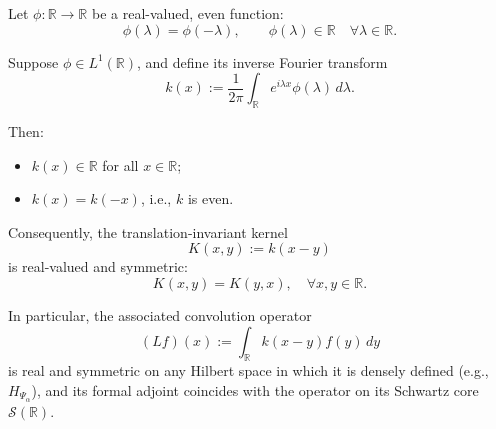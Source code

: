 \begin{lemma}
\label{lem:fourier_symmetry_reflection}
Let \( \phi \colon \mathbb{R} \to \mathbb{R} \) be a real-valued, even function:
\[
\phi(\lambda) = \phi(-\lambda), \qquad \phi(\lambda) \in \mathbb{R} \quad \forall \lambda \in \mathbb{R}.
\]

Suppose \( \phi \in L^1(\mathbb{R}) \), and define its inverse Fourier transform
\[
k(x) := \frac{1}{2\pi} \int_{\mathbb{R}} e^{i \lambda x} \phi(\lambda)\, d\lambda.
\]

Then:
\begin{itemize}
    \item \( k(x) \in \mathbb{R} \) for all \( x \in \mathbb{R} \);
    \item \( k(x) = k(-x) \), i.e., \( k \) is even.
\end{itemize}

Consequently, the translation-invariant kernel
\[
K(x,y) := k(x - y)
\]
is real-valued and symmetric:
\[
K(x,y) = K(y,x), \quad \forall x, y \in \mathbb{R}.
\]

In particular, the associated convolution operator
\[
(Lf)(x) := \int_{\mathbb{R}} k(x - y) f(y)\, dy
\]
is real and symmetric on any Hilbert space in which it is densely defined (e.g., \( H_{\Psi_\alpha} \)), and its formal adjoint coincides with the operator on its Schwartz core \( \mathcal{S}(\mathbb{R}) \).
\end{lemma}
